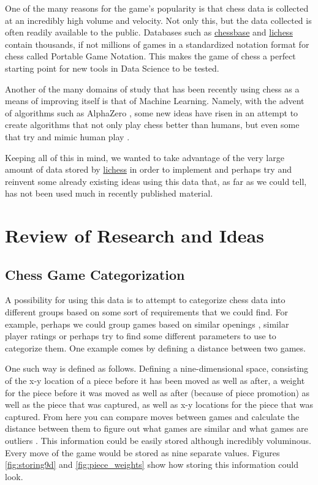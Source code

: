 \documentclass[12pt]{article}
\begin{document}
    One of the many reasons for the game's popularity is that chess data is collected at an incredibly high volume and velocity. Not only this, but the data collected is often readily available to the public. Databases such as \href{https://database.chessbase.com/}{chessbase} and \href{https://database.lichess.org/}{lichess} contain thousands, if not millions of games in a standardized notation format for chess called Portable Game Notation. This makes the game of chess a perfect starting point for new tools in Data Science to be tested.

    Another of the many domains of study that has been recently using chess as a means of improving itself is that of Machine Learning. Namely, with the advent of algorithms such as AlphaZero \cite{alphazero}, some new ideas have risen in an attempt to create algorithms that not only play chess better than humans, but even some that try and mimic human play \cite{maiachess}.

    Keeping all of this in mind, we wanted to take advantage of the very large amount of data stored by \href{https://lichess.org/}{lichess} in order to implement and perhaps try and reinvent some already existing ideas using this data that, as far as we could tell, has not been used much in recently published material.
    
    \section{Review of Research and Ideas}

    \subsection{Chess Game Categorization}

    A possibility for using this data is to attempt to categorize chess data into different groups based on some sort of requirements that we could find. For example, perhaps we could group games based on similar openings \cite{eco}, similar player ratings or perhaps try to find some different parameters to use to categorize them. One example comes by defining a distance between two games.

    One such way is defined as follows. Defining a nine-dimensional space, consisting of the x-y location of a piece before it has been moved as well as after, a weight for the piece before it was moved as well as after (because of piece promotion) as well as the piece that was captured, as well as x-y locations for the piece that was captured. From here you can compare moves between games and calculate the distance between them to figure out what games are similar and what games are outliers \cite{main}. This information could be easily stored although incredibly voluminous. Every move of the game would be stored as nine separate values. Figures \ref{fig:storing9d} and \ref{fig:piece_weights} show how storing this information could look.
\end{document}
